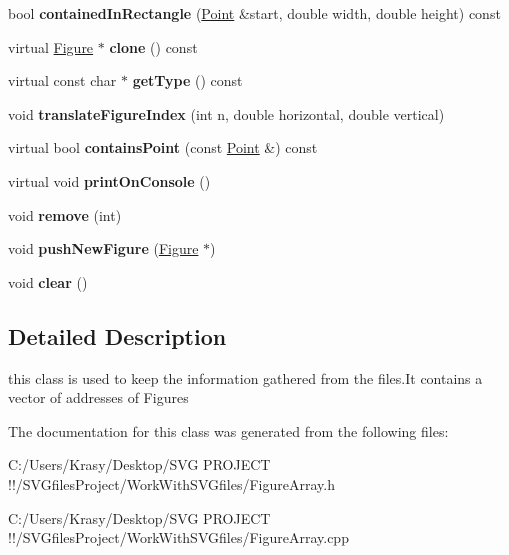 \begin{DoxyCompactItemize}
bool {\bfseries contained\+In\+Rectangle} (\mbox{\hyperlink{struct_point}{Point}} \&start, double width, double height) const
\item 
\mbox{\label{class_figure_array_a61eb8080289984b0b4f4ab6223dff5e7}} 
virtual \mbox{\hyperlink{class_figure}{Figure}} $\ast$ {\bfseries clone} () const
\item 
\mbox{\label{class_figure_array_a2aba5ed654c6cc23db153f8f7bb69eb8}} 
virtual const char $\ast$ {\bfseries get\+Type} () const
\item 
\mbox{\label{class_figure_array_a753ab2cf2720fa7b873719bab8e53a3d}} 
void {\bfseries translate\+Figure\+Index} (int n, double horizontal, double vertical)
\item 
\mbox{\label{class_figure_array_acbac0c1e267c4591b219cdb993bb46f5}} 
virtual bool {\bfseries contains\+Point} (const \mbox{\hyperlink{struct_point}{Point}} \&) const
\item 
\mbox{\label{class_figure_array_a4d8468b298894bee1cf283bb062dd6ca}} 
virtual void {\bfseries print\+On\+Console} ()
\item 
\mbox{\label{class_figure_array_a2ce4b5399e97232ddaf4f8ca18b1ddc3}} 
void {\bfseries remove} (int)
\item 
\mbox{\label{class_figure_array_a3015510c1fae81110a428c82be3d2f4e}} 
void {\bfseries push\+New\+Figure} (\mbox{\hyperlink{class_figure}{Figure}} $\ast$)
\item 
\mbox{\label{class_figure_array_a5405e4e7482ec612c419cea3c1376c24}} 
void {\bfseries clear} ()
\end{DoxyCompactItemize}


\subsection{Detailed Description}
this class is used to keep the information gathered from the files.\+It contains a vector of addresses of Figures 

The documentation for this class was generated from the following files\+:\begin{DoxyCompactItemize}
\item 
C\+:/\+Users/\+Krasy/\+Desktop/\+S\+V\+G P\+R\+O\+J\+E\+C\+T !!/\+S\+V\+Gfiles\+Project/\+Work\+With\+S\+V\+Gfiles/Figure\+Array.\+h\item 
C\+:/\+Users/\+Krasy/\+Desktop/\+S\+V\+G P\+R\+O\+J\+E\+C\+T !!/\+S\+V\+Gfiles\+Project/\+Work\+With\+S\+V\+Gfiles/Figure\+Array.\+cpp\end{DoxyCompactItemize}
